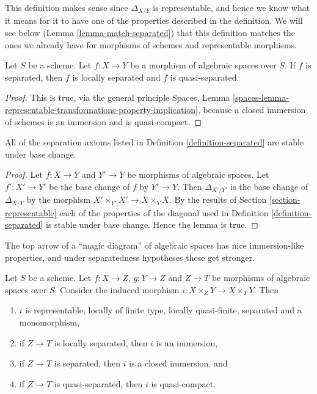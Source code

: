 \noindent
This definition makes sense since $\Delta_{X/Y}$ is representable,
and hence we know what it means for it to have one of the properties
described in the definition. We will see below
(Lemma \ref{lemma-match-separated}) that this definition matches the ones
we already have for morphisms of schemes and representable morphisms.

\begin{lemma}
\label{lemma-trivial-implications}
Let $S$ be a scheme. Let $f : X \to Y$ be a morphism of algebraic spaces
over $S$. If $f$ is separated, then $f$ is locally separated and
$f$ is quasi-separated.
\end{lemma}

\begin{proof}
This is true, via the general principle
Spaces,
Lemma \ref{spaces-lemma-representable-transformations-property-implication},
because a closed immersion of schemes is an immersion and is quasi-compact.
\end{proof}

\begin{lemma}
\label{lemma-base-change-separated}
All of the separation axioms listed in Definition \ref{definition-separated}
are stable under base change.
\end{lemma}

\begin{proof}
Let $f : X \to Y$ and $Y' \to Y$ be morphisms of algebraic spaces.
Let $f' : X' \to Y'$ be the base change of $f$ by $Y' \to Y$. Then
$\Delta_{X'/Y'}$ is the base change of $\Delta_{X/Y}$ by
the morphism $X' \times_{Y'} X' \to X \times_Y X$. By the results of
Section \ref{section-representable}
each of the properties of the diagonal used in
Definition \ref{definition-separated}
is stable under base change. Hence the lemma is true.
\end{proof}

\begin{lemma}
\label{lemma-fibre-product-after-map}
\begin{slogan}
The top arrow of a ``magic diagram'' of algebraic spaces has nice
immersion-like properties, and under separatedness hypotheses
these get stronger.
\end{slogan}
Let $S$ be a scheme. Let $f : X \to Z$, $g : Y \to Z$ and $Z \to T$
be morphisms of algebraic spaces over $S$. Consider the induced morphism
$i : X \times_Z Y \to X \times_T Y$. Then
\begin{enumerate}
\item $i$ is representable, locally of finite type, locally quasi-finite,
separated and a monomorphism,
\item if $Z \to T$ is locally separated, then $i$ is an immersion,
\item if $Z \to T$ is separated, then $i$ is a closed immersion, and
\item if $Z \to T$ is quasi-separated, then $i$ is quasi-compact.
\end{enumerate}
\end{lemma}

